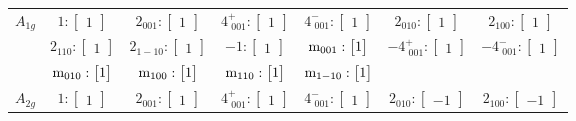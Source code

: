 \documentclass[fleqn,8pt,landscape]{jsarticle}
\begin{document}
\begin{longtable}{ccccccc}
$ A_{1g} $ & $ 1:\begin{bmatrix} 1 \end{bmatrix} $ & $ 2{}_{001}:\begin{bmatrix} 1 \end{bmatrix} $ & $ 4^{+}_{\,\,001}:\begin{bmatrix} 1 \end{bmatrix} $ & $ 4^{-}_{\,\,001}:\begin{bmatrix} 1 \end{bmatrix} $ & $ 2{}_{010}:\begin{bmatrix} 1 \end{bmatrix} $ & $ 2{}_{100}:\begin{bmatrix} 1 \end{bmatrix} $ \\
& $ 2{}_{110}:\begin{bmatrix} 1 \end{bmatrix} $ & $ 2{}_{1-10}:\begin{bmatrix} 1 \end{bmatrix} $ & $ -1:\begin{bmatrix} 1 \end{bmatrix} $ & $ {\rm m}_{001}:\begin{bmatrix} 1 \end{bmatrix} $ & $ -4^{+}_{\,\,001}:\begin{bmatrix} 1 \end{bmatrix} $ & $ -4^{-}_{\,\,001}:\begin{bmatrix} 1 \end{bmatrix} $ \\
& $ {\rm m}_{010}:\begin{bmatrix} 1 \end{bmatrix} $ & $ {\rm m}_{100}:\begin{bmatrix} 1 \end{bmatrix} $ & $ {\rm m}_{110}:\begin{bmatrix} 1 \end{bmatrix} $ & $ {\rm m}_{1-10}:\begin{bmatrix} 1 \end{bmatrix} $ & $  $ & $  $ \\ \hline
$ A_{2g} $ & $ 1:\begin{bmatrix} 1 \end{bmatrix} $ & $ 2{}_{001}:\begin{bmatrix} 1 \end{bmatrix} $ & $ 4^{+}_{\,\,001}:\begin{bmatrix} 1 \end{bmatrix} $ & $ 4^{-}_{\,\,001}:\begin{bmatrix} 1 \end{bmatrix} $ & $ 2{}_{010}:\begin{bmatrix} -1 \end{bmatrix} $ & $ 2{}_{100}:\begin{bmatrix} -1 \end{bmatrix} $ \\

\end{longtable}
\end{document}
